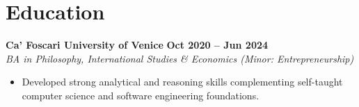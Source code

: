 \documentclass[11pt,a4paper]{article}
\begin{document}
\section{Education}
\noindent \textbf{Ca' Foscari University of Venice} \hfill \textbf{Oct 2020 -- Jun 2024} \\
\textit{BA in Philosophy, International Studies \& Economics (Minor: Entrepreneurship)} 
\begin{itemize}[leftmargin=*,itemsep=2pt]
    \item Developed strong analytical and reasoning skills complementing self-taught computer science and software engineering foundations.
\end{itemize}
\end{document}
